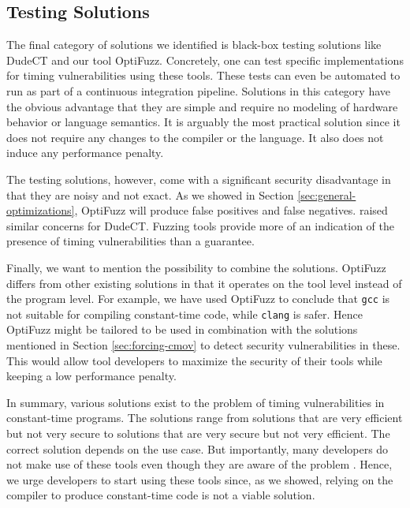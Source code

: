 \subsection{Testing Solutions}
The final category of solutions we identified is black-box testing solutions like DudeCT \citep{dudect} and our tool OptiFuzz.
Concretely, one can test specific implementations for timing vulnerabilities using these tools.
These tests can even be automated to run as part of a continuous integration pipeline.
Solutions in this category have the obvious advantage that they are simple and require no modeling of hardware behavior or language semantics.
It is arguably the most practical solution since it does not require any changes to the compiler or the language.
It also does not induce any performance penalty.

The testing solutions, however, come with a significant security disadvantage in that they are noisy and not exact.
As we showed in Section \ref{sec:general-optimizations}, OptiFuzz will produce false positives and false negatives.
\citeauthor{dudect} raised similar concerns for DudeCT.
Fuzzing tools provide more of an indication of the presence of timing vulnerabilities than a guarantee.

Finally, we want to mention the possibility to combine the solutions.
OptiFuzz differs from other existing solutions in that it operates on the tool level instead of the program level.
For example, we have used OptiFuzz to conclude that \texttt{gcc} is not suitable for compiling constant-time code, while \texttt{clang} is safer.
Hence OptiFuzz might be tailored to be used in combination with the solutions mentioned in Section \ref{sec:forcing-cmov} to detect security vulnerabilities in these.
This would allow tool developers to maximize the security of their tools while keeping a low performance penalty.

In summary, various solutions exist to the problem of timing vulnerabilities in constant-time programs.
The solutions range from solutions that are very efficient but not very secure to solutions that are very secure but not very efficient.
The correct solution depends on the use case.
But importantly, many developers do not make use of these tools even though they are aware of the problem \citep{developer-survey-timing-attacks}.
Hence, we urge developers to start using these tools since, as we showed, relying on the compiler to produce constant-time code is not a viable solution.